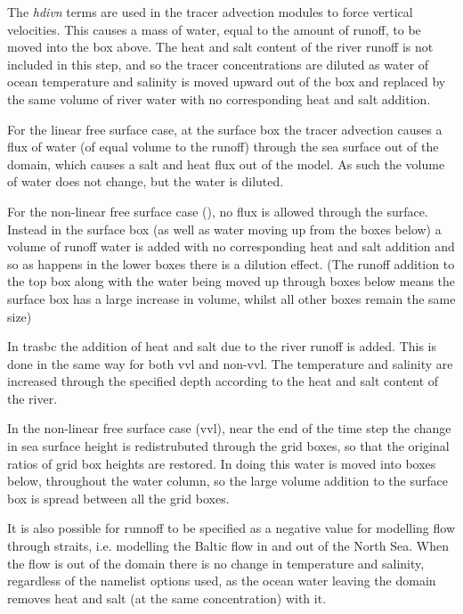 \documentclass[../tex_main/NEMO_manual]{subfiles}
\begin{document}
The \textit{hdivn} terms are used in the tracer advection modules to force vertical velocities.
This causes a mass of water, equal to the amount of runoff, to be moved into the box above.
The heat and salt content of the river runoff is not included in this step,
and so the tracer concentrations are diluted as water of ocean temperature and salinity is moved upward out of
the box and replaced by the same volume of river water with no corresponding heat and salt addition.

For the linear free surface case, at the surface box the tracer advection causes a flux of water
(of equal volume to the runoff) through the sea surface out of the domain,
which causes a salt and heat flux out of the model.
As such the volume of water does not change, but the water is diluted.

For the non-linear free surface case (), no flux is allowed through the surface.
Instead in the surface box (as well as water moving up from the boxes below) a volume of runoff water is added with
no corresponding heat and salt addition and so as happens in the lower boxes there is a dilution effect.
(The runoff addition to the top box along with the water being moved up through
boxes below means the surface box has a large increase in volume, whilst all other boxes remain the same size)

In trasbc the addition of heat and salt due to the river runoff is added.
This is done in the same way for both vvl and non-vvl.
The temperature and salinity are increased through the specified depth according to
the heat and salt content of the river. 

In the non-linear free surface case (vvl),
near the end of the time step the change in sea surface height is redistrubuted through the grid boxes,
so that the original ratios of grid box heights are restored.
In doing this water is moved into boxes below, throughout the water column,
so the large volume addition to the surface box is spread between all the grid boxes.

It is also possible for runnoff to be specified as a negative value for modelling flow through straits,
i.e. modelling the Baltic flow in and out of the North Sea.
When the flow is out of the domain there is no change in temperature and salinity,
regardless of the namelist options used,
as the ocean water leaving the domain removes heat and salt (at the same concentration) with it. 


\end{document}

